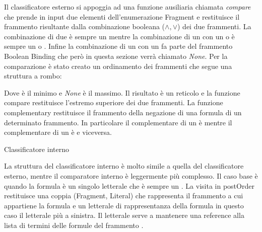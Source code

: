 \documentclass[./main.tex]{subfiles}
\begin{document}
Il classificatore esterno si appoggia ad una funzione ausiliaria chiamata \textit{compare} che prende in input due elementi 
dell'enumerazione Fragment e restituisce il frammento risultante dalla combinazione booleana ($\land, \lor$) dei due frammenti.
La combinazione di due \ob è sempre un \ob mentre la combinazione di un \ob con un \cb o \dbb è sempre un \cb o \dbb.
Infine la combinazione di un \cb con un \dbb fa parte del frammento Boolean Binding che però in questa sezione verrà chiamato \textit{None}.
Per la comparazione è stato creato un ordinamento dei frammenti che segue una struttura a rombo:

\begin{center}
\end{center}

Dove \ob è il minimo e \textit{None} è il massimo.
Il risultato è un reticolo e la funzione compare restituisce l'estremo superiore dei due frammenti.
La funzione complementary restituisce il frammento della negazione di una formula di un determinato frammento.
In particolare il complementare di un \ob è \ob mentre il complementare di un \cb è \dbb e viceversa.



\begin{algorithm}[H] \label{alg:innerClassifier}
    \caption{Classificatore interno}


\end{algorithm}

La struttura del classificatore interno è molto simile a quella del classificatore esterno, mentre il comparatore interno
è leggermente più complesso. Il caso base è quando la formula è un singolo letterale che è sempre un \ob.
La visita in postOrder restituisce una coppia (Fragment, Literal) che rappresenta il frammento a cui appartiene la formula e un letterale
di rappresentanza della formula in questo caso il letterale più a sinistra. 
Il letterale serve a mantenere una reference alla lista di termini delle formule del frammento \ob.
\end{document}
